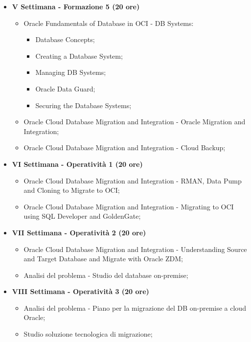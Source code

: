 {\begin{itemize}
        \item \textbf{V Settimana - Formazione 5 (20 ore)} %
        \begin{itemize}
            \item Oracle Fundamentals of Database in OCI - DB Systems:
            \begin{itemize}
                \item Database Concepts;
                \item Creating a Database System;
                \item Managing DB Systems;
                \item Oracle Data Guard;
                \item Securing the Database Systems;
            \end{itemize} 
            \item Oracle Cloud Database Migration and Integration - Oracle Migration and Integration;
            \item Oracle Cloud Database Migration and Integration - Cloud Backup;
        \end{itemize}

        \item \textbf{VI Settimana - Operatività 1 (20 ore)} %
        \begin{itemize}
            \item Oracle Cloud Database Migration and Integration - RMAN, Data Pump and Cloning to Migrate to OCI;
            \item Oracle Cloud Database Migration and Integration - Migrating to OCI using SQL Developer and GoldenGate;  
        \end{itemize}

        \item \textbf{VII Settimana - Operatività 2 (20 ore)} %
        \begin{itemize}
            \item Oracle Cloud Database Migration and Integration - Understanding Source and Target Database and Migrate with Oracle ZDM; 
            \item Analisi del problema - Studio del database on-premise;
        \end{itemize}

        \item \textbf{VIII Settimana - Operatività 3 (20 ore)} %
        \begin{itemize}
            \item Analisi del problema - Piano per la migrazione del DB on-premise a cloud Oracle;
            \item Studio soluzione tecnologica di migrazione; 
        \end{itemize}


\end{itemize}}
